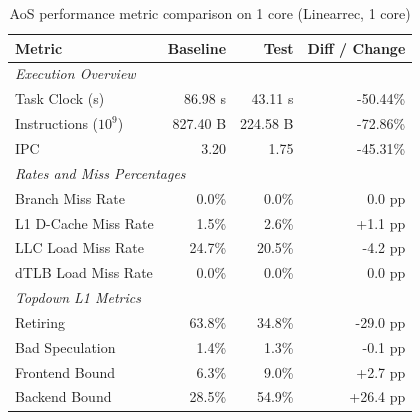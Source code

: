 \begin{table}[htbp]
  \centering
  \caption{AoS performance metric comparison on 1 core (Linearrec, 1 core)}
  \label{tab:perf_comparison_aos_linearrec_1core}
  \begin{tabular}{lrrr}
    \toprule
    \textbf{Metric} & \textbf{Baseline} & \textbf{Test} & \textbf{Diff / Change} \\
    \midrule
    \multicolumn{4}{l}{\textit{Execution Overview}} \\
    \quad Task Clock (s)           & 86.98 s   & 43.11 s   & -50.44\%   \\
    \quad Instructions ($10^9$)    & 827.40 B  & 224.58 B  & -72.86\%   \\
    \quad IPC                      & 3.20       & 1.75       & -45.31\%   \\
    \midrule
    \multicolumn{4}{l}{\textit{Rates and Miss Percentages}} \\
    \quad Branch Miss Rate         & 0.0\%      & 0.0\%      & 0.0 pp     \\
    \quad L1 D-Cache Miss Rate     & 1.5\%      & 2.6\%      & +1.1 pp    \\
    \quad LLC Load Miss Rate       & 24.7\%     & 20.5\%     & -4.2 pp    \\
    \quad dTLB Load Miss Rate      & 0.0\%      & 0.0\%      & 0.0 pp     \\
    \midrule
    \multicolumn{4}{l}{\textit{Topdown L1 Metrics}} \\
    \quad Retiring                 & 63.8\%     & 34.8\%     & -29.0 pp   \\
    \quad Bad Speculation          & 1.4\%     & 1.3\%     & -0.1 pp   \\
    \quad Frontend Bound           & 6.3\%     & 9.0\%     & +2.7 pp   \\
    \quad Backend Bound            & 28.5\%     & 54.9\%     & +26.4 pp   \\
    \bottomrule
  \end{tabular}
\end{table}

